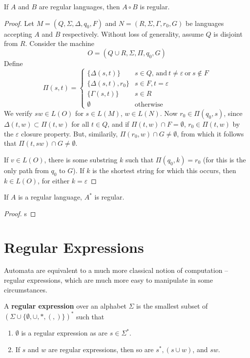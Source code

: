 \begin{theorem}
    If $A$ and $B$ are regular languages, then $A \circ B$ is regular.
\end{theorem}
\begin{proof}
    Let $M = (Q, \Sigma, \Delta, q_0, F)$ and $N = (R, \Sigma, \Gamma, r_0, G)$ be languages accepting $A$ and $B$ respectively. Without loss of generality, assume $Q$ is disjoint from $R$. Consider the machine
    \[ O = (Q \cup R, \Sigma, \Pi, q_0, G) \]
    Define
    \[ \Pi(s,t) = \begin{cases} \{ \Delta(s,t) \} & s \in Q\text{, and}\ t \neq \varepsilon\ \text{or}\ s \not \in F \\ \{ \Delta(s,t), r_0 \} & s \in F, t = \varepsilon\\ \{ \Gamma(s,t) \} & s \in R\\
    \emptyset & \text{otherwise} \end{cases} \]
    We verify $sw \in L(O)$ for $s \in L(M)$, $w \in L(N)$. Now $r_0 \in \Pi(q_0, s)$, since $\Delta(t,w) \subset \Pi(t,w)$ for all $t \in Q$, and if $\Pi(t, w) \cap F = \emptyset$, $r_0 \in \Pi(t, w)$ by the $\varepsilon$ closure property. But, similarily, $\Pi(r_0, w) \cap G \neq \emptyset$, from which it follows that $\Pi(t, sw) \cap G \neq \emptyset$.

    If $v \in L(O)$, there is some substring $k$ such that $\Pi(q_0, k) = r_0$ (for this is the only path from $q_0$ to $G$). If $k$ is the shortest string for which this occurs, then $k \in L(O)$, for either $k = \varepsilon$
\end{proof}

\begin{theorem}
    If $A$ is a regular language, $A^*$ is regular.
\end{theorem}
\begin{proof}
    s
\end{proof}

\section{Regular Expressions}

Automata are equivalent to a much more classical notion of computation -- regular expressions, which are much more easy to manipulate in some circumstances.

\begin{definition}
    A {\bf regular expression} over an alphabet $\Sigma$ is the smallest subset of $(\Sigma \cup \{ \emptyset, \cup, *, (, ) \})^*$ such that
    \begin{enumerate}
        \item $\emptyset$ is a regular expression as are $s \in \Sigma^*$.
        \item If $s$ and $w$ are regular expressions, then so are $s^*, (s \cup w)$, and $sw$.
    \end{enumerate}
\end{definition}


